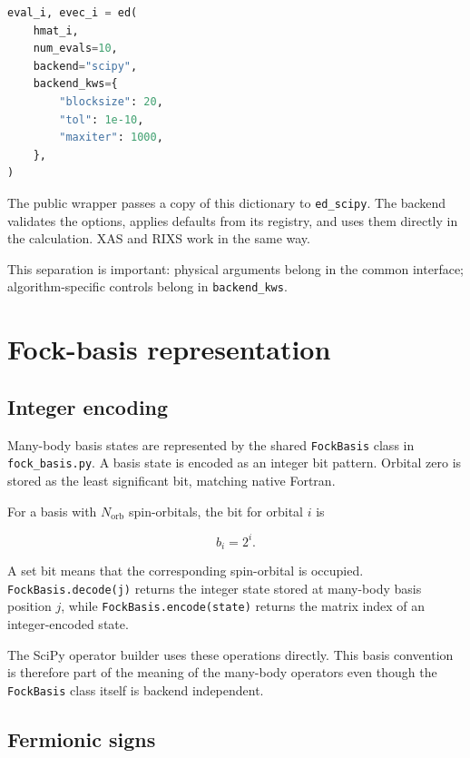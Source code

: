 \documentclass[11pt]{article}
\begin{document}
\begin{lstlisting}[language=Python]
eval_i, evec_i = ed(
    hmat_i,
    num_evals=10,
    backend="scipy",
    backend_kws={
        "blocksize": 20,
        "tol": 1e-10,
        "maxiter": 1000,
    },
)
\end{lstlisting}

The public wrapper passes a copy of this dictionary to \texttt{ed\_scipy}. The backend validates the options, applies defaults from its registry, and uses them directly in the calculation. XAS and RIXS work in the same way.

This separation is important: physical arguments belong in the common interface; algorithm-specific controls belong in \texttt{backend\_kws}.

\section{Fock-basis representation}

\subsection{Integer encoding}

Many-body basis states are represented by the shared \texttt{FockBasis} class in \texttt{fock\_basis.py}.  A basis state is encoded as an integer bit pattern.  Orbital zero is stored as the least significant bit, matching native Fortran.

For a basis with \(N_{\mathrm{orb}}\) spin-orbitals, the bit for orbital \(i\) is

\begin{equation}
  b_i = 2^i.
\end{equation}

A set bit means that the corresponding spin-orbital is occupied.  \texttt{FockBasis.decode(j)} returns the integer state stored at many-body basis position \(j\), while \texttt{FockBasis.encode(state)} returns the matrix index of an integer-encoded state.

The SciPy operator builder uses these operations directly.  This basis convention is therefore part of the meaning of the many-body operators even though the \texttt{FockBasis} class itself is backend independent.

\subsection{Fermionic signs}
\end{document}
